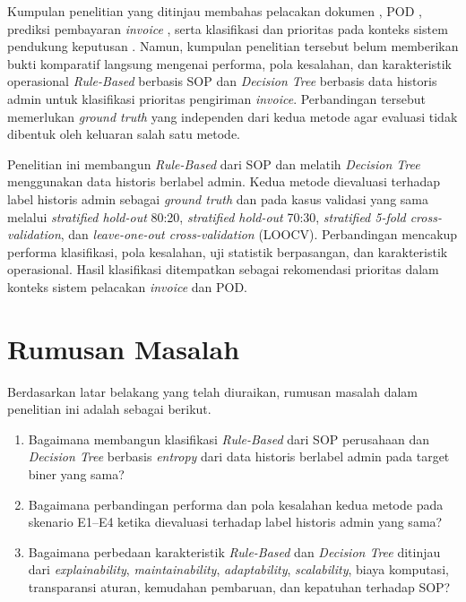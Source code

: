 Kumpulan penelitian yang ditinjau membahas pelacakan dokumen \cite{10.1007/978-3-642-55032-4_33}, POD \cite{gunadhya_rajawali_logistik_2021}, prediksi pembayaran \textit{invoice} \cite{firmansyah,dyahikbal}, serta klasifikasi dan prioritas pada konteks sistem pendukung keputusan \cite{Diwandari_Sela_Syahputra_Parama_Septiarini_2023}. Namun, kumpulan penelitian tersebut belum memberikan bukti komparatif langsung mengenai performa, pola kesalahan, dan karakteristik operasional \textit{Rule-Based} berbasis SOP dan \textit{Decision Tree} berbasis data historis admin untuk klasifikasi prioritas pengiriman \textit{invoice}. Perbandingan tersebut memerlukan \textit{ground truth} yang independen dari kedua metode agar evaluasi tidak dibentuk oleh keluaran salah satu metode.

Penelitian ini membangun \textit{Rule-Based} dari SOP dan melatih \textit{Decision Tree} menggunakan data historis berlabel admin. Kedua metode dievaluasi terhadap label historis admin sebagai \textit{ground truth} dan pada kasus validasi yang sama melalui \textit{stratified hold-out} 80:20, \textit{stratified hold-out} 70:30, \textit{stratified 5-fold cross-validation}, dan \textit{leave-one-out cross-validation} (LOOCV). Perbandingan mencakup performa klasifikasi, pola kesalahan, uji statistik berpasangan, dan karakteristik operasional. Hasil klasifikasi ditempatkan sebagai rekomendasi prioritas dalam konteks sistem pelacakan \textit{invoice} dan POD.

\section{Rumusan Masalah}

Berdasarkan latar belakang yang telah diuraikan, rumusan masalah dalam penelitian ini adalah sebagai berikut.

\begin{enumerate}
    \item Bagaimana membangun klasifikasi \textit{Rule-Based} dari SOP perusahaan dan \textit{Decision Tree} berbasis \textit{entropy} dari data historis berlabel admin pada target biner yang sama?
    \item Bagaimana perbandingan performa dan pola kesalahan kedua metode pada skenario E1--E4 ketika dievaluasi terhadap label historis admin yang sama?
    \item Bagaimana perbedaan karakteristik \textit{Rule-Based} dan \textit{Decision Tree} ditinjau dari \textit{explainability}, \textit{maintainability}, \textit{adaptability}, \textit{scalability}, biaya komputasi, transparansi aturan, kemudahan pembaruan, dan kepatuhan terhadap SOP?
\end{enumerate}

